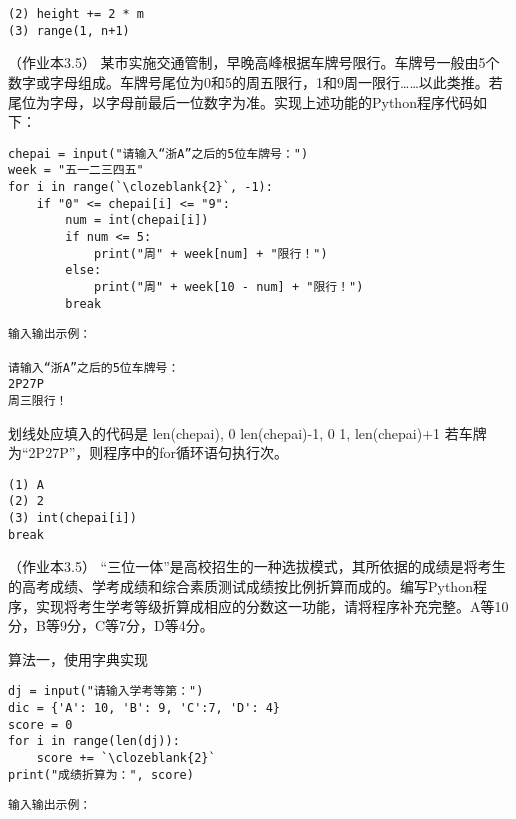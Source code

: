 \begin{groups}
\begin{questions}[rp]
\begin{solution}
\begin{lstlisting}
(2) height += 2 * m
(3) range(1, n+1)
\end{lstlisting}
\end{solution}


\setcounter{qnumber}{1}
\question （{\kaishu 作业本3.5}）
某市实施交通管制，早晚高峰根据车牌号限行。车牌号一般由5个数字或字母组成。车牌号尾位为0和5的周五限行，1和9周一限行……以此类推。若尾位为字母，以字母前最后一位数字为准。实现上述功能的Python程序代码如下：
\begin{paracol}{2}
\begin{lstlisting}
chepai = input("请输入“浙A”之后的5位车牌号：")
week = "五一二三四五"
for i in range(`\clozeblank{2}`, -1):
    if "0" <= chepai[i] <= "9":
        num = int(chepai[i])
        if num <= 5:
            print("周" + week[num] + "限行！")
        else:
        	print("周" + week[10 - num] + "限行！")
        break
\end{lstlisting}
\switchcolumn
\begin{lstlisting}[frame=single]
输入输出示例：

请输入“浙A”之后的5位车牌号：
2P27P
周三限行！
\end{lstlisting}
\end{paracol}

\begin{subquestions}
\subquestion 划线处应填入的代码是
{len(chepai), 0}
{len(chepai)-1, 0}
{1, len(chepai)+1}
\subquestion 若车牌为“2P27P”，则程序中的for循环语句执行次。
\end{subquestions}

\begin{solution}
\begin{lstlisting}
(1) A
(2) 2
(3) int(chepai[i])
break
\end{lstlisting}
\end{solution}


\setcounter{qnumber}{1}
\question （{\kaishu 作业本3.5}）
“三位一体”是高校招生的一种选拔模式，其所依据的成绩是将考生的高考成绩、学考成绩和综合素质测试成绩按比例折算而成的。编写Python程序，实现将考生学考等级折算成相应的分数这一功能，请将程序补充完整。A等10分，B等9分，C等7分，D等4分。

\begin{subquestions}
\subquestion 算法一，使用字典实现
\begin{paracol}{2}
\begin{lstlisting}
dj = input("请输入学考等第：")
dic = {'A': 10, 'B': 9, 'C':7, 'D': 4}
score = 0
for i in range(len(dj)):
    score += `\clozeblank{2}`
print("成绩折算为：", score)
\end{lstlisting}
\switchcolumn
\begin{lstlisting}[frame=single]
输入输出示例：


\end{lstlisting}
\end{paracol}
\end{subquestions}
\end{questions}
\end{groups}
